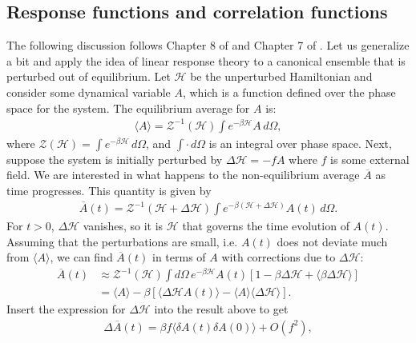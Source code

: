 \documentclass[reprint,
nofootinbib,
amsmath,amssymb,
aps]{revtex4-1}
\newcommand{\be}{\beta}
\newcommand{\f}[2]{\frac{#1}{#2}}
\newcommand{\lb}{\left[}
\newcommand{\rb}{\right]}
\begin{document}
\subsection{Response functions and correlation functions}
The following discussion follows  Chapter 8 of \cite{chandler1988introduction} and Chapter 7 of \cite{chaikin1995principles}. Let us generalize a bit and apply the idea of linear response theory to a canonical ensemble that is perturbed out of equilibrium. Let $\mathcal{H}$ be the unperturbed Hamiltonian and consider some dynamical variable $A$, which is a function defined over the phase space for the system. The equilibrium average for $A$ is:
\begin{align*}
\langle A \rangle =  \mathcal{Z}^{-1}(\mathcal{H}) \int e^{-\be \mathcal{H}} A\, d\Omega,
\end{align*}
where $\mathcal{Z}(\mathcal{H}) = \int e^{-\be \mathcal{H}} \, d\Omega$, and $\int \cdot \,d\Omega$ is an integral over phase space. Next, suppose the system is initially perturbed by $\Delta \mathcal{H} = -f A$ where $f$ is some external field. We are interested in what happens to the non-equilibrium average $\overline{A}$ as time progresses. This quantity is given by 
\begin{align*}
\overline{A}(t) = \mathcal{Z}^{-1}(\mathcal{H} + \Delta \mathcal{H})  \int e^{-\be(\mathcal{H} + \Delta \mathcal{H})} A(t) \, d\Omega. 
\end{align*}
For $t>0$, $\Delta \mathcal{H}$ vanishes, so it is $\mathcal{H}$ that governs the time evolution of $A(t)$. Assuming that the perturbations are small, i.e. $A(t)$ does not deviate much from $\langle A \rangle$, we can find $\overline{A}(t)$ in terms of $A$ with corrections due to $\Delta \mathcal{H}$:
\begin{align*}
\overline{A}(t) 
&\approx \mathcal{Z}^{-1}(\mathcal{H})  \int d\Omega \, e^{-\be \mathcal{H}} A(t)   \lb 1 - \be \Delta \mathcal{H}  + \langle  \be \Delta \mathcal{H}  \rangle  \rb \\ 
&= \langle A \rangle - \be \lb \langle \Delta \mathcal{H} A(t) \rangle - \langle A \rangle \langle \Delta \mathcal{H} \rangle  \rb.
\end{align*}
Insert the expression for $\Delta \mathcal{H}$ into the result above to get
\begin{align}
\label{eq:fluctuation}
\Delta \overline{A}(t) = \be f \langle \delta A(t) \delta A(0) \rangle + {O}(f^2),
\end{align}
\end{document}
